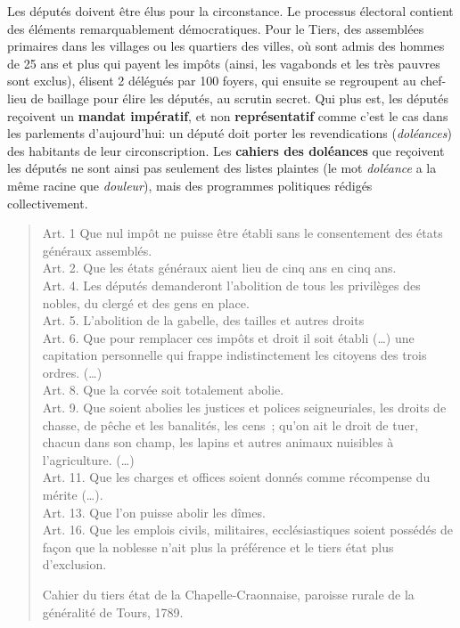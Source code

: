 \documentclass[
  french,
  letterpaper,
  DIV=11,
  numbers=noendperiod]{scrartcl}
\begin{document}
Les députés doivent être élus pour la circonstance. Le processus
électoral contient des éléments remarquablement démocratiques. Pour le
Tiers, des assemblées primaires dans les villages ou les quartiers des
villes, où sont admis des hommes de 25 ans et plus qui payent les impôts
(ainsi, les vagabonds et les très pauvres sont exclus), élisent 2
délégués par 100 foyers, qui ensuite se regroupent au chef-lieu de
baillage pour élire les députés, au scrutin secret. Qui plus est, les
députés reçoivent un \textbf{mandat impératif}, et non
\textbf{représentatif} comme c'est le cas dans les parlements
d'aujourd'hui: un député doit porter les revendications
(\emph{doléances}) des habitants de leur circonscription. Les
\textbf{cahiers des doléances} que reçoivent les députés ne sont ainsi
pas seulement des listes plaintes (le mot \emph{doléance} a la même
racine que \emph{douleur}), mais des programmes politiques rédigés
collectivement.

\begin{quote}
Art. 1 Que nul impôt ne puisse être établi sans le consentement des
états généraux assemblés.\\
Art. 2. Que les états généraux aient lieu de cinq ans en cinq ans.\\
Art. 4. Les députés demanderont l'abolition de tous les privilèges des
nobles, du clergé et des gens en place.\\
Art. 5. L'abolition de la gabelle, des tailles et autres droits\\
Art. 6. Que pour remplacer ces impôts et droit il soit établi (\ldots)
une capitation personnelle qui frappe indistinctement les citoyens des
trois ordres. (\ldots)\\
Art. 8. Que la corvée soit totalement abolie.\\
Art. 9. Que soient abolies les justices et polices seigneuriales, les
droits de chasse, de pêche et les banalités, les cens~; qu'on ait le
droit de tuer, chacun dans son champ, les lapins et autres animaux
nuisibles à l'agriculture. (\ldots)\\
Art. 11. Que les charges et offices soient donnés comme récompense du
mérite (\ldots).\\
Art. 13. Que l'on puisse abolir les dîmes.\\
Art. 16. Que les emplois civils, militaires, ecclésiastiques soient
possédés de façon que la noblesse n'ait plus la préférence et le tiers
état plus d'exclusion.

Cahier du tiers état de la Chapelle-Craonnaise, paroisse rurale de la
généralité de Tours, 1789.
\end{quote}
\end{document}

